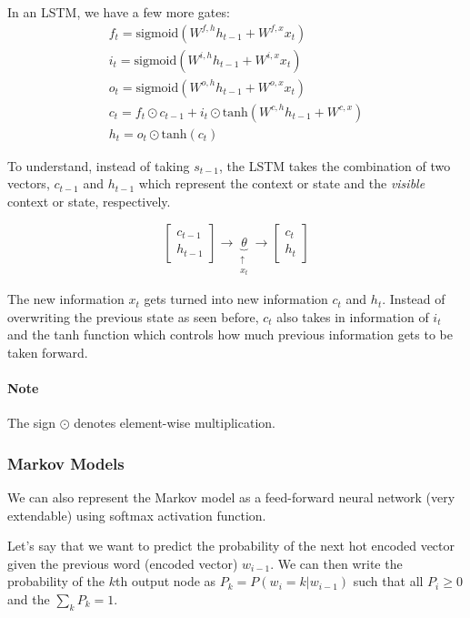 \documentclass{article}
\begin{document}
In an LSTM, we have a few more gates:
\begin{align*}
	f_t=\text{sigmoid}\left(W^{f,h}h_{t-1}+W^{f,x}x_t\right)\tag{forget gate}\\
	i_t=\text{sigmoid}\left(W^{i,h}h_{t-1}+W^{i,x}x_t\right)\tag{input gate}\\
	o_t=\text{sigmoid}\left(W^{o,h}h_{t-1}+W^{o,x}x_t\right)\tag{output gate}\\
	c_t=f_t\odot c_{t-1}+i_t\odot\text{tanh}\left(W^{c,h}h_{t-1}+W^{c,x}\right)\tag{memory cell}\\
	h_t=o_t\odot\text{tanh}(c_t)\tag{visible state}
\end{align*}

To understand, instead of taking $s_{t-1}$, the LSTM takes the combination of two vectors, $c_{t-1}$ and $h_{t-1}$ which represent the context or state and the \emph{visible} context or state, respectively.

$$\begin{bmatrix}c_{t-1}\\h_{t-1}\end{bmatrix}\rightarrow\underbrace{\theta}_{\substack{\uparrow\\ x_t}}\rightarrow\begin{bmatrix}c_t\\h_t\end{bmatrix}$$

The new information $x_t$ gets turned into new information $c_t$ and $h_t$. Instead of overwriting the previous state as seen before, $c_t$ also takes in information of $i_t$ and the tanh function which controls how much previous information gets to be taken forward.

\paragraph{Note} The sign $\odot$ denotes element-wise multiplication.

\subsubsection{Markov Models}
We can also represent the Markov model as a feed-forward neural network (very extendable) using softmax activation function.

Let's say that we want to predict the probability of the next hot encoded vector given the previous word (encoded vector) $w_{i-1}$. We can then write the probability of the $k$th output node as $P_k=P(w_i=k|w_{i-1})$ such that all $P_i\geq 0$ and the $\sum_k P_k=1$.
\end{document}
